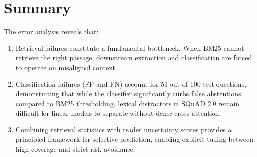 \section{Summary}
\label{sec:err_summary}

The error analysis reveals that:

\begin{enumerate}
  \item Retrieval failures constitute a fundamental bottleneck. When BM25
        cannot retrieve the right passage, downstream extraction and
        classification are forced to operate on misaligned context.

  \item Classification failures (FP and FN) account for 51 out of 100 test
        questions, demonstrating that while the classifier significantly curbs
        false abstentions compared to BM25 thresholding, lexical distractors
        in SQuAD 2.0 remain difficult for linear models to separate without dense cross-attention.

  \item Combining retrieval statistics with reader uncertainty scores provides
        a principled framework for selective prediction, enabling explicit tuning
        between high coverage and strict risk avoidance.
\end{enumerate}
